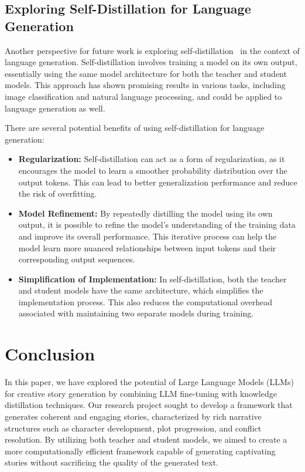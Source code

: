 \documentclass{article} %
\begin{document}
\subsection{Exploring Self-Distillation for Language Generation}
Another perspective for future work is exploring self-distillation~\cite{zhang2019teacher} in the context of language generation. Self-distillation involves training a model on its own output, essentially using the same model architecture for both the teacher and student models. This approach has shown promising results in various tasks, including image classification and natural language processing, and could be applied to language generation as well.

There are several potential benefits of using self-distillation for language generation:
\begin{itemize}
    \item \textbf{Regularization:} Self-distillation can act as a form of regularization, as it encourages the model to learn a smoother probability distribution over the output tokens. This can lead to better generalization performance and reduce the risk of overfitting.

    \item \textbf{Model Refinement:} By repeatedly distilling the model using its own output, it is possible to refine the model's understanding of the training data and improve its overall performance. This iterative process can help the model learn more nuanced relationships between input tokens and their corresponding output sequences.

    \item \textbf{Simplification of Implementation:} In self-distillation, both the teacher and student models have the same architecture, which simplifies the implementation process. This also reduces the computational overhead associated with maintaining two separate models during training.
\end{itemize}
\section{Conclusion}
In this paper, we have explored the potential of Large Language Models (LLMs) for creative story generation by combining LLM fine-tuning with knowledge distillation techniques. Our research project sought to develop a framework that generates coherent and engaging stories, characterized by rich narrative structures such as character development, plot progression, and conflict resolution. By utilizing both teacher and student models, we aimed to create a more computationally efficient framework capable of generating captivating stories without sacrificing the quality of the generated text.
\end{document}
